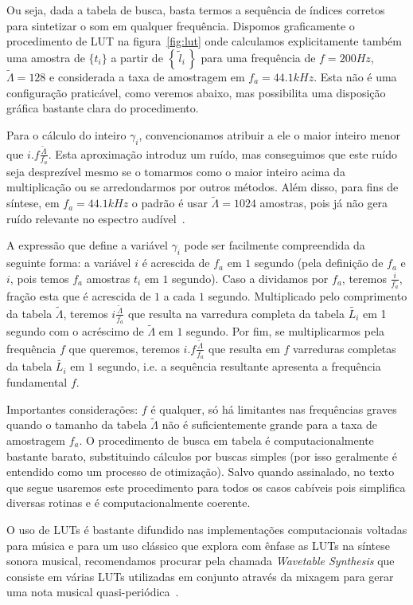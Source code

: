 Ou seja, dada a tabela de busca, basta termos a sequência de índices corretos
para sintetizar o som em qualquer frequência. Dispomos graficamente
o procedimento de LUT na figura~\ref{fig:lut} onde calculamos explicitamente
também uma amostra de $\{t_i\}$ a partir de $\left\{\,\widetilde{l}_i\,\right\}$ para uma frequência
de $f=200Hz$, $\widetilde{\Lambda}=128$ e considerada a taxa de amostragem em $f_a=44.1kHz$.
Esta não é uma configuração praticável, como veremos abaixo, mas possibilita uma
disposição gráfica bastante clara do procedimento.


Para o cálculo do inteiro $\gamma_i$, convencionamos
atribuir a ele o maior inteiro menor que $i.f\frac{\widetilde{\Lambda}}{f_a}$.
Esta aproximação introduz um ruído, mas conseguimos que este ruído seja desprezível
mesmo se o tomarmos como o maior inteiro acima da multiplicação
ou se arredondarmos por outros métodos. Além disso, para fins de síntese, em $f_a=44.1 kHz$
 o padrão é usar $\widetilde{\Lambda} = 1024$ amostras, pois já não gera ruído
 relevante no espectro audível~\cite{Geiger}.

 A expressão que define a variável $\gamma_i$ pode ser facilmente compreendida da
 seguinte forma: a variável $i$ é acrescida de $f_a$ em $1$ segundo (pela
 definição de $f_a$ e $i$, pois temos $f_a$ amostras $t_i$ em $1$ segundo). Caso a dividamos por $f_a$, teremos $\frac{i}{f_a}$,
fração esta que é acrescida de $1$ a cada $1$ segundo. Multiplicado pelo comprimento da
 tabela $\widetilde{\Lambda}$, teremos $i \frac{\widetilde{\Lambda}}{f_a}$
 que resulta na varredura completa da tabela $\widetilde{L_i}$ em 
 1 segundo com o acréscimo de $\widetilde{\Lambda}$ em $1$ segundo. Por fim,
 se multiplicarmos pela frequência $f$ que queremos, teremos $i . f \frac{\widetilde{\Lambda}}{f_a}$
 que resulta em $f$ varreduras completas da tabela $\widetilde{L_i}$ em $1$ segundo, i.e. a sequência
 resultante apresenta a frequência fundamental $f$.

Importantes considerações: $f$ é qualquer, só há limitantes nas frequências
graves quando o tamanho da tabela $\widetilde{\Lambda}$ não é suficientemente grande para a taxa de amostragem
$f_a$. O procedimento de busca em tabela
é computacionalmente bastante barato, substituindo cálculos por buscas simples (por isso geralmente
é entendido como um processo de otimização). Salvo quando assinalado,
no texto que segue usaremos este procedimento para todos os casos cabíveis pois
simplifica diversas rotinas e é computacionalmente coerente.

O uso de LUTs é bastante difundido nas implementações computacionais
voltadas para música e para um uso clássico que explora com ênfase
as LUTs na síntese sonora musical, recomendamos procurar pela chamada 
\emph{Wavetable Synthesis} que consiste em várias LUTs utilizadas em 
conjunto através da mixagem para gerar uma nota musical quasi-periódica~\cite{Cook,Wavetable}.


